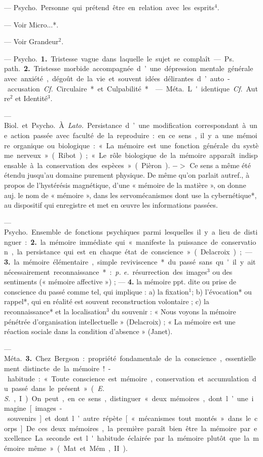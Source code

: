 \begin{itemize}[leftmargin=1cm, label=, itemsep=1pt]
 — \si{Psycho.} Personne qui
prétend être en relation avec les
esprits$^4$.

 — Voir Micro...*.

 — Voir Grandeur$^2$.

 — \si{Psycho.} {\bf 1.} Tristesse
vague dans laquelle le sujet se complaît. — \si{Ps. path.} {\bf 2.} Tristesse morbide accompagnée d’une dépression mentale générale avec anxiété,
dégoût de la vie et souvent idées
délirantes d’auto-accusation. {\it Cf.} Circulaire* et Culpabilité*.

 — \si{Méta.} L'identique. {\it Cf.}
Autre$^2$ et Identité$^3$.

 — \si{Biol.} et \si{Psycho.} À. {\it Lato.}
Persistance d’une modification correspondant à une action passée avec
faculté de la reproduire : en ce sens,
il y a une mémoire organique ou
biologique : « La mémoire est une
fonction générale du système nerveux » (Ribot) ; « Le rôle biologique
de la mémoire apparaît indispensable à la conservation des espèces »
(Pièron). $->$ Ce sens a même été
étendu jusqu’au domaine purement
physique. De même qu’on parlait
autref., à propos de l'hystérésis
magnétique, d’une « mémoire de la
matière », on donne auj. le nom de
« mémoire », dans les servomécanismes dont use la cybernétique*,
au dispositif qui enregistre et met
en œuvre les informations passées.

— \si{Psycho.} Ensemble de fonctions psychiques parmi lesquelles il
y a lieu de distinguer : {\bf 2.} la mémoire immédiate qui « manifeste la puissance
de conservation, la persistance qui
est en chaque état de conscience »
(Delacroix) ; — {\bf 3.} la mémoire élémentaire, simple reviviscence* du passé
sans qu'il y ait nécessairement
reconnaissance* : {\it p. e.} résurrection
des images$^3$ ou des sentiments (« mémoire affective ») ; — {\bf 4.} la mémoire
ppt. dite ou prise de conscience du
passé comme tel, qui implique :
a) la fixation$^1$; b) l’évocation* ou
rappel*, qui en réalité est souvent
reconstruction volontaire ; c) la reconnaissance* et la localisation$^3$ du
souvenir : « Nous voyons la mémoire
pénétrée d'organisation intellectuelle » (Delacroix) ; « La mémoire
est une réaction sociale dans la
condition d'absence » (Janet).

— \si{Méta.} {\bf 3.} Chez Bergson : propriété fondamentale de la conscience,
essentiellement distincte de la mémoire!-habitude : « Toute conscience
est mémoire, conservation et accumulation du passé dans le présent »
({\it E. S.}, I). On peut, en ce sens, distinguer
« deux mémoires, dont l’une imagine [images-souvenirs] et dont
l’autre répète [« mécanismes tout
montés » dans le corps]... De ces
deux mémoires, la première paraît
bien être la mémoire par excellence.
La seconde. est l'habitude éclairée
par la mémoire plutôt que la mémoire
même » (Mat. et Mém., II).


\end{itemize}
